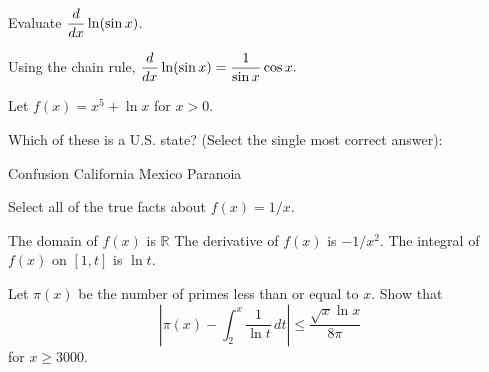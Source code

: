 \documentclass[11pt]{exam}
\begin{document}
\begin{questions}

\question[5]
Evaluate
$\begin{displaystyle}
  \frac{d}{dx} \ln (\sin x)
\end{displaystyle}$.

\begin{solution}[5in]
Using the chain rule, 
\( \begin{displaystyle} 
\frac{d}{dx} \ln (\sin x) = \frac{1}{\sin x} \cos x. 
\end{displaystyle} \) 
\end{solution}

\newpage

\question Let $f(x) =  x^5 + \ln x$ for $x > 0$. 

\newpage

\question[3] Which of these is a U.S. state?  (Select the single most correct answer): 
\begin{choices}
\choice Confusion
\CorrectChoice California
\choice Mexico
\choice Paranoia
\end{choices}

\question[3] Select all of the true facts about $f(x) = 1/x$.
\begin{checkboxes}
\choice The domain of $f(x)$ is $\mathbb{R}$ 
\CorrectChoice The derivative of $f(x)$ is $-1/x^2$. 
\CorrectChoice The integral of $f(x)$ on $[1,t]$ is $\ln t$.
\end{checkboxes}

\bonusquestion[5] Let $\pi(x)$ be the number of primes less than or equal to $x$. 
Show that 
\[ \left | \pi(x) - \int_2^x \frac{1}{\ln t} \, dt \right| 
\leq \frac{\sqrt{x} \ln x}{8 \pi} \] 
for $x \geq 3000$.  
\end{questions}
\end{document}
